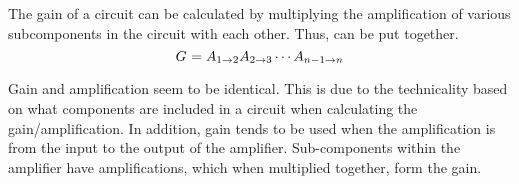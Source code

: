 The gain of a circuit can be calculated by multiplying the amplification of various subcomponents in the circuit with each other.
Thus,  can be put together.
\begin{equation}\label{eq:Gain-Broken}
  G_{} = A_{1 \to 2} A_{2 \to 3} \cdots A_{n-1 \to n}
\end{equation}

\begin{remark*}
  Gain and amplification seem to be identical.
  This is due to the technicality based on what components are included in a circuit when calculating the gain/amplification.
  In addition, gain tends to be used when the amplification is from the input to the output of the amplifier.
  Sub-components within the amplifier have amplifications, which when multiplied together, form the gain.
\end{remark*}

